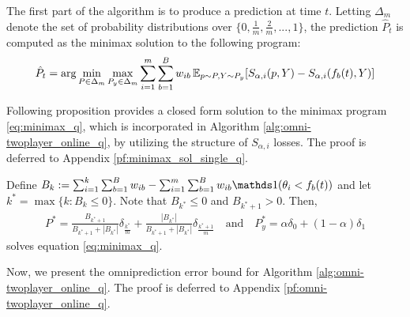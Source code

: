 The first part of the algorithm is to produce a prediction at time $t$. Letting $\Delta_m$ denote the set of probability distributions over $\{0, \frac{1}{m}, \frac{2}{m}, ...,1\}$, the prediction $\hat{P}_t$ is computed as the minimax solution to the following program:
\begin{align}\label{eq:minimax_q}
  \hat{P}_t = \arg\min_{P \in \Delta_m} \max_{P_y \in \Delta_m} \sum_{i=1}^{m} \sum_{b=1}^B w_{ib} \,\mathbb{E}_{p\sim P, Y \sim P_y}[S_{\alpha,i}(p,Y) - S_{\alpha,i}(f_b(t),Y)] 
\end{align}



Following proposition provides a closed form solution to the minimax program \eqref{eq:minimax_q}, which is incorporated in Algorithm \ref{alg:omni-twoplayer_online_q}, by utilizing the structure of $S_{\alpha, i}$ losses. The proof is deferred to Appendix \ref{pf:minimax_sol_single_q}.

\begin{prop} \label{prop:minimax_sol_single_q} Define $B_k := \sum_{i=1}^{k} \sum_{b=1}^B w_{ib} - \sum_{i=1}^{m} \sum_{b=1}^B w_{ib} \one(\theta_i < f_b(t))$ and let $k^* = \max\{k: B_k \leq 0\}$. Note that $B_{k^*} \leq 0$ and $B_{k^*+1}>0$. Then, 
\begin{align*}
P^* = \frac{B_{k^*+1}}{B_{k^*+1} + |B_{k^*}|}\delta_{\frac{k^*}{m}} + \frac{|B_{k^*}|}{B_{k^*+1} + |B_{k^*}|}\delta_{\frac{k^*+1}{m}} 
\quad\text{and}\quad
P_y^* = \alpha \delta_0 + (1-\alpha) \delta_1 
\end{align*}
solves equation \eqref{eq:minimax_q}.
\end{prop}

Now, we present the omniprediction error bound for Algorithm \ref{alg:omni-twoplayer_online_q}. The proof is deferred to Appendix \ref{pf:omni-twoplayer_online_q}.

